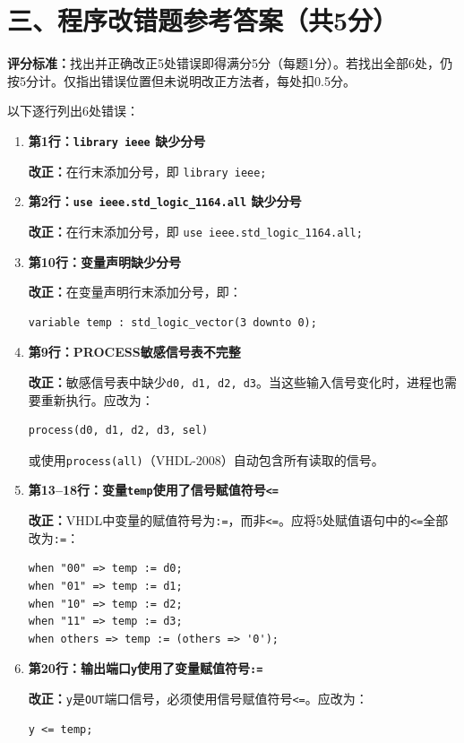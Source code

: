 \section*{三、程序改错题参考答案（共5分）}

\begin{framed}
\textbf{评分标准：}找出并正确改正5处错误即得满分5分（每题1分）。若找出全部6处，仍按5分计。仅指出错误位置但未说明改正方法者，每处扣0.5分。
\end{framed}

以下逐行列出6处错误：

\begin{enumerate}[label=\textbf{错误\arabic*：}]

\item \textbf{第1行：\texttt{library ieee} 缺少分号}

\textbf{改正：}在行末添加分号，即 \texttt{library ieee;}

\item \textbf{第2行：\texttt{use ieee.std\_logic\_1164.all} 缺少分号}

\textbf{改正：}在行末添加分号，即 \texttt{use ieee.std\_logic\_1164.all;}

\item \textbf{第10行：变量声明缺少分号}

\textbf{改正：}在变量声明行末添加分号，即：
\begin{lstlisting}
variable temp : std_logic_vector(3 downto 0);
\end{lstlisting}

\item \textbf{第9行：PROCESS敏感信号表不完整}

\textbf{改正：}敏感信号表中缺少\texttt{d0, d1, d2, d3}。当这些输入信号变化时，进程也需要重新执行。应改为：
\begin{lstlisting}
process(d0, d1, d2, d3, sel)
\end{lstlisting}

\noindent 或使用\texttt{process(all)}（VHDL-2008）自动包含所有读取的信号。

\item \textbf{第13--18行：变量\texttt{temp}使用了信号赋值符号\texttt{<=}}

\textbf{改正：}VHDL中变量的赋值符号为\texttt{:=}，而非\texttt{<=}。应将5处赋值语句中的\texttt{<=}全部改为\texttt{:=}：
\begin{lstlisting}
when "00" => temp := d0;
when "01" => temp := d1;
when "10" => temp := d2;
when "11" => temp := d3;
when others => temp := (others => '0');
\end{lstlisting}

\item \textbf{第20行：输出端口\texttt{y}使用了变量赋值符号\texttt{:=}}

\textbf{改正：}\texttt{y}是\texttt{OUT}端口信号，必须使用信号赋值符号\texttt{<=}。应改为：
\begin{lstlisting}
y <= temp;
\end{lstlisting}

\end{enumerate}

